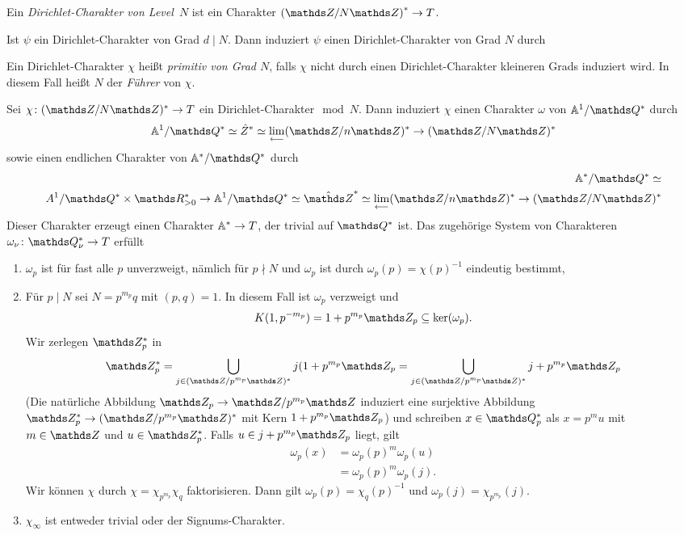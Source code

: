 \begin{defi}
Ein \emph{Dirichlet-Charakter von \glqq Level\grqq\ $N$}
ist ein Charakter $\left(\Z/N\Z\right)^\ast \to T$.
\end{defi}
Ist $\psi$ ein Dirichlet-Charakter von Grad $d \mid N$.
Dann induziert $\psi$ einen Dirichlet-Charakter von Grad $N$ durch
\begin{defi}
Ein Dirichlet-Charakter $\chi$ heißt \emph{primitiv von Grad $N$},
falls $\chi$ nicht durch einen Dirichlet-Charakter kleineren Grads induziert wird.
In diesem Fall heißt $N$ der \emph{Führer} von $\chi$.
\end{defi}
\begin{prop}
Sei $\chi \colon (\Z/N\Z)^\ast \to T$ ein Dirichlet-Charakter$\mod N$.
Dann induziert $\chi$ einen Charakter $\omega$ von $\A^1/\Q^\ast$ durch
\begin{align*}
\A^1/\Q^\ast \simeq \hat{Z}^\ast \simeq \lim_{\longleftarrow} (\Z/n\Z)^\ast \to (\Z/N\Z)^\ast
\end{align*}
sowie einen endlichen Charakter von $\A^\ast/\Q^\ast$
durch
\begin{align*}
\A^\ast/\Q^\ast \simeq \\A^1/\Q^\ast \times \R_{>0}^\ast \to \A^1/\Q^\ast \simeq \hat{\Z}^\ast \simeq \lim_{\longleftarrow} (\Z/n\Z)^\ast \to (\Z/N\Z)^\ast
\end{align*}
Dieser Charakter erzeugt einen Charakter $\mathbb{A}^\ast \to T$, der trivial auf $\Q^\ast$ ist.
Das zugehörige System von Charakteren $\omega_\nu \colon \Q_\nu^\ast \to T$ erfüllt
\begin{enumerate}[label=\roman*)]
\item $\omega_p$ ist für fast alle $p$ unverzweigt, nämlich für $p \nmid N$ und $\omega_p$
ist durch $\omega_p(p)=\chi(p)^{-1}$ eindeutig bestimmt,
\item Für $p \mid N$ sei $N=p^{m_p}q$ mit $(p,q)=1$. In diesem Fall ist $\omega_p$ verzweigt und
\begin{align*}
K(1,p^{-m_p})=1+p^{m_p}\Z_p \subseteq \ker(\omega_p).
\end{align*}
Wir zerlegen $\Z_p^\ast$ in
\begin{align*}
\Z_p^\ast=\bigcup_{j \in (\Z/p^{m_p}\Z)^\ast} j(1+p^{m_p}\Z_p=\bigcup_{j \in (\Z/p^{m_p}\Z)^\ast} j+p^{m_p}\Z_p
\end{align*}
(Die natürliche Abbildung $\Z_p \to \Z/p^{m_p}\Z$ induziert eine surjektive Abbildung $\Z_p^\ast \to (\Z/p^{m_p} \Z)^\ast$ mit Kern $1+p^{m_p}\Z_p$) und schreiben $x \in \Q_p^\ast$ als
$x=p^m u$ mit $m \in \Z$ und $u \in \Z_p^\ast$. Falls $u \in j+p^{m_p}\Z_p$ liegt, gilt
\begin{align*}
\omega_p(x)&=\omega_p(p)^m\omega_p(u)\\
&=\omega_p(p)^m \omega_p(j).
\end{align*}
Wir können $\chi$ durch $\chi=\chi_{p^{m_p}} \chi_q$ faktorisieren.
Dann gilt $\omega_p(p)=\chi_q(p)^{-1}$ und $\omega_p(j)=\chi_{p^{m_p}}(j)$.
\item $\chi_\infty$ ist entweder trivial oder der Signums-Charakter.
\end{enumerate}
\end{prop}

